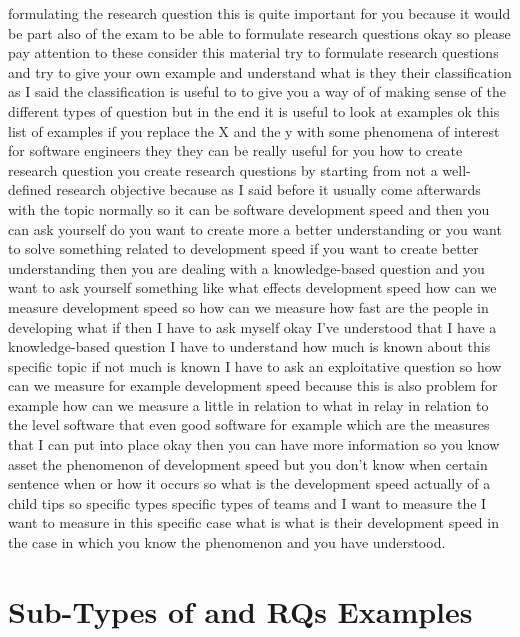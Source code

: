\documentclass[conference, compsoc, twoside]{IEEEtran}
\begin{document}
formulating the research question this is quite important for you because it would be part also of the exam to be able to formulate research questions okay so please pay attention to these consider this material try to formulate research questions and try to give your own example and understand what is they their classification as I said the classification is useful to to give you a way of of making sense of the different types of question but in the end it is useful to look at examples ok this list of examples if you replace the X and the y with some phenomena of interest for software engineers they they can be really useful for you how to create research question you create research questions by starting from not a well-defined research objective because as I said before it usually come afterwards with the topic normally so it can be software development speed and then you can ask yourself do you want to create more a better understanding or you want to solve something related to development speed if you want to create better understanding then you are dealing with a knowledge-based question and you want to ask yourself something like what effects development speed how can we measure development speed so how can we measure how fast are the people in developing what if then I have to ask myself okay I've understood that I have a knowledge-based question I have to understand how much is known about this specific topic if not much is known I have to ask an exploitative question so how can we measure for example development speed because this is also problem for example how can we measure a little in relation to what in relay in relation to the level software that even good software for example which are the measures that I can put into place okay then you can have more information so you know asset the phenomenon of development speed but you don't know when certain sentence when or how it occurs so what is the development speed actually of a child tips so specific types specific types of teams and I want to measure the I want to measure in this specific case what is what is their development speed in the case in which you know the phenomenon and you have understood.

\section{Sub-Types of and RQs Examples} %
\end{document}
